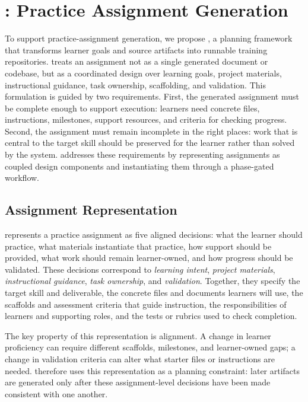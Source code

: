 \section{\model: Practice Assignment Generation}

To support practice-assignment generation, we propose \model, a planning framework that transforms learner goals and source artifacts into runnable training repositories.
\model treats an assignment not as a single generated document or codebase, but as a coordinated design over learning goals, project materials, instructional guidance, task ownership, scaffolding, and validation.
This formulation is guided by two requirements.
First, the generated assignment must be complete enough to support execution: learners need concrete files, instructions, milestones, support resources, and criteria for checking progress.
Second, the assignment must remain incomplete in the right places: work that is central to the target skill should be preserved for the learner rather than solved by the system.
\model addresses these requirements by representing assignments as coupled design components and instantiating them through a phase-gated workflow.

\subsection{Assignment Representation}

\model represents a practice assignment as five aligned decisions: what the learner should practice, what materials instantiate that practice, how support should be provided, what work should remain learner-owned, and how progress should be validated.
These decisions correspond to \textit{learning intent}, \textit{project materials}, \textit{instructional guidance}, \textit{task ownership}, and \textit{validation}.
Together, they specify the target skill and deliverable, the concrete files and documents learners will use, the scaffolds and assessment criteria that guide instruction, the responsibilities of learners and supporting roles, and the tests or rubrics used to check completion.

The key property of this representation is alignment.
A change in learner proficiency can require different scaffolds, milestones, and learner-owned gaps; a change in validation criteria can alter what starter files or instructions are needed.
\model therefore uses this representation as a planning constraint: later artifacts are generated only after these assignment-level decisions have been made consistent with one another.

